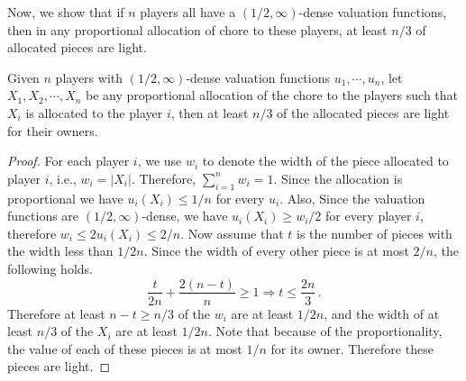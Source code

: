Now, we show that if $n$ players all have a $(1/2,\infty)$-dense valuation functions, then in any proportional allocation of chore to these players, at least $n/3$ of allocated pieces are light.
\begin{lemma}
\label{light}
Given $n$ players with $(1/2,\infty)$-dense valuation functions $u_1,\cdots,u_n$, let $X_1,X_2,\cdots,X_n$ be any proportional allocation of the chore to the players such that $X_i$ is allocated to the player $i$, then at least $n/3$ of the allocated pieces are light for their owners.
\end{lemma}
\begin{proof}
For each player $i$, we use $w_i$ to denote the width of the piece allocated to player $i$, i.e., $w_i = |X_i|$. Therefore, $\sum_{i=1}^{n} w_i =1$. Since the allocation is proportional we have $u_i(X_i) \le 1/n$ for every $u_i$. Also, Since the valuation functions are $(1/2,\infty)$-dense, we have $u_i(X_i) \ge w_i/2$ for every player $i$, therefore $w_i \le 2 u_i(X_i) \le 2/n$. Now assume that $t$ is the number of pieces with the width less than $1/2n$. Since the width of every other piece is at most $2/n$, the following holds.
$$
\dfrac{t}{2n}+ \dfrac{2(n-t)} {n} \ge 1 \Rightarrow t \le \dfrac{2n}{3} \,.
$$
Therefore at least $n-t \ge n/3$ of the $w_i$ are at least $1/2n$, and the width of at least $n/3$ of the $X_i$ are at least $1/2n$. Note that because of the proportionality, the value of each of these pieces is at most $1/n$ for its owner. Therefore these pieces are light.
\end{proof}

